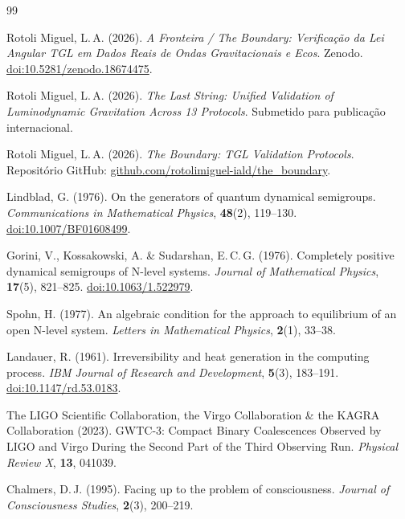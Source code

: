 \documentclass[12pt, a4paper]{article}
\theoremstyle{tglstyle}
\theoremstyle{definition}
\begin{document}
\newpage
\begin{thebibliography}{99}

Rotoli Miguel, L.\,A. (2026).
\textit{A Fronteira / The Boundary: Verificação da Lei Angular TGL em Dados Reais de Ondas Gravitacionais e Ecos}.
Zenodo. \href{https://doi.org/10.5281/zenodo.18674475}{doi:10.5281/zenodo.18674475}.

Rotoli Miguel, L.\,A. (2026).
\textit{The Last String: Unified Validation of Luminodynamic Gravitation Across 13 Protocols}.
Submetido para publicação internacional.

Rotoli Miguel, L.\,A. (2026).
\textit{The Boundary: TGL Validation Protocols}.
Repositório GitHub: \href{https://github.com/rotolimiguel-iald/the_boundary}{github.com/rotolimiguel-iald/the\_boundary}.

Lindblad, G. (1976).
On the generators of quantum dynamical semigroups.
\textit{Communications in Mathematical Physics}, \textbf{48}(2), 119--130.
\href{https://doi.org/10.1007/BF01608499}{doi:10.1007/BF01608499}.

Gorini, V., Kossakowski, A. \& Sudarshan, E.\,C.\,G. (1976).
Completely positive dynamical semigroups of N-level systems.
\textit{Journal of Mathematical Physics}, \textbf{17}(5), 821--825.
\href{https://doi.org/10.1063/1.522979}{doi:10.1063/1.522979}.

Spohn, H. (1977).
An algebraic condition for the approach to equilibrium of an open N-level system.
\textit{Letters in Mathematical Physics}, \textbf{2}(1), 33--38.

Landauer, R. (1961).
Irreversibility and heat generation in the computing process.
\textit{IBM Journal of Research and Development}, \textbf{5}(3), 183--191.
\href{https://doi.org/10.1147/rd.53.0183}{doi:10.1147/rd.53.0183}.

The LIGO Scientific Collaboration, the Virgo Collaboration \& the KAGRA Collaboration (2023).
GWTC-3: Compact Binary Coalescences Observed by LIGO and Virgo During the Second Part of the Third Observing Run.
\textit{Physical Review X}, \textbf{13}, 041039.

Chalmers, D.\,J. (1995).
Facing up to the problem of consciousness.
\textit{Journal of Consciousness Studies}, \textbf{2}(3), 200--219.


\end{thebibliography}
\end{document}
